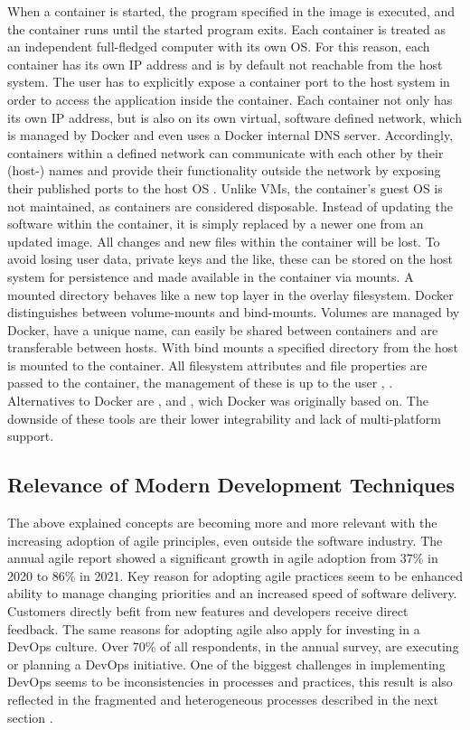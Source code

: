 \documentclass[12pt, a4paper]{article}
\begin{document}
        When a container is started, the program specified in the image is executed, and the container runs until the started program exits. Each container is treated as an independent full-fledged computer with its own \ac{OS}. For this reason, each container has its own \acs{IP} address and is by default not reachable from the host system. The user has to explicitly expose a container port to the host system in order to access the application inside the container. Each container not only has its own \acs{IP} address, but is also on its own virtual, software defined network, which is managed by Docker and even uses a Docker internal \ac{DNS} server. Accordingly, containers within a defined network can communicate with each other by their (host-) names and provide their functionality outside the network by exposing their published ports to the host \ac{OS} \cite{docker2020}.\newline
        Unlike \ac{VM}s, the container's guest \ac{OS} is not maintained, as containers are considered disposable. Instead of updating the software within the container, it is simply replaced by a newer one from an updated image. All changes and new files within the container will be lost. To avoid losing user data, private keys and the like, these can be stored on the host system for persistence and made available in the container via mounts. A mounted directory behaves like a new top layer in the overlay filesystem. Docker distinguishes between volume-mounts and bind-mounts. Volumes are managed by Docker, have a unique name, can easily be shared between containers and are transferable between hosts. With bind mounts a specified directory from the host is mounted to the container. All filesystem attributes and file properties are passed to the container, the management of these is up to the user \cite{docker2020}, \cite{dockerdocs}.\newline
        Alternatives to Docker are ,  and , wich Docker was originally based on. The downside of these tools are their lower integrability and lack of multi-platform support.

    \subsection{Relevance of Modern Development Techniques}
    The above explained concepts are becoming more and more relevant with the increasing adoption of agile principles, even outside the software industry. The annual agile report showed a significant growth in agile adoption from 37\% in 2020 to 86\% in 2021. Key reason for adopting agile practices seem to be enhanced ability to manage changing priorities and an increased speed of software delivery. Customers directly befit from new features and developers receive direct feedback. The same reasons for adopting agile also apply for investing in a DevOps culture. Over 70\% of all respondents, in the annual survey, are executing or planning a DevOps initiative. One of the biggest challenges in implementing DevOps seems to be inconsistencies in processes and practices, this result is also reflected in the fragmented and heterogeneous processes described in the next section \cite{agilereport2021}.
\end{document}
